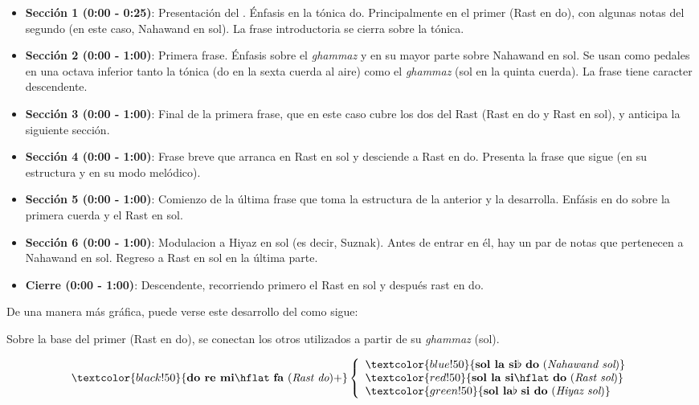 \begin{itemize}
\item \textbf{Sección 1 (0:00 - 0:25)}: Presentación del \maqamb. Énfasis en la tónica do. Principalmente en el primer \yins (Rast en do), con algunas notas del segundo (en este caso, Nahawand en sol). La frase introductoria se cierra sobre la tónica.
\item \textbf{Sección 2 (0:00 - 1:00)}: Primera frase. Énfasis sobre el \emph{ghammaz} y en su mayor parte sobre Nahawand en sol. Se usan como pedales en una octava inferior tanto la tónica (do en la sexta cuerda al aire) como el \emph{ghammaz} (sol en la quinta cuerda). La frase tiene caracter descendente.
\item \textbf{Sección 3 (0:00 - 1:00)}: Final de la primera frase, que en este caso cubre los dos \ashnas del \maqam Rast (Rast en do y Rast en sol), y anticipa la siguiente sección.
\item \textbf{Sección 4 (0:00 - 1:00)}: Frase breve que arranca en Rast en sol y desciende a Rast en do. Presenta la frase que sigue (en su estructura y en su modo melódico).
\item \textbf{Sección 5 (0:00 - 1:00)}: Comienzo de la última frase que toma la estructura de la anterior y la desarrolla. Enfásis en do sobre la primera cuerda y el \yins Rast en sol.
\item \textbf{Sección 6 (0:00 - 1:00)}: Modulacion a \yins Hiyaz en sol (es decir, \maqam Suznak). Antes de entrar en él, hay un par de notas que pertenecen a Nahawand en sol. Regreso a Rast en sol en la última parte.
\item \textbf{Cierre (0:00 - 1:00)}: Descendente, recorriendo primero el \yins Rast en sol y después rast en do.
\end{itemize}

De una manera más gráfica, puede verse este desarrollo del \maqam como sigue:

Sobre la base del primer \yins (Rast en do), se conectan los otros \yins utilizados a partir de su \emph{ghammaz} (sol).

\[
    \textcolor{black!50}{\text{\textbf{do re mi}}\hflat\ \text{\textbf{fa} ({\it Rast do})}+} \left\{\begin{array}{lr}
        \textcolor{blue!50}{\text{\textbf{sol la si}}\flat\ \text{\textbf{do} ({\it Nahawand sol})}}\\
        \textcolor{red!50}{\text{\textbf{sol la si}}\hflat\ \text{\textbf{do} ({\it Rast sol})}}\\
        \textcolor{green!50}{\text{\textbf{sol la}}\flat\ \text{\textbf{si do} ({\it Hiyaz sol})}}
        \end{array}\right.
  \]

